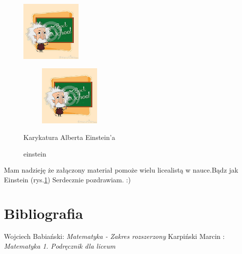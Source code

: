 \documentclass[12pt,a4paper]{article}
\begin{document}
\begin{figure}
\includegraphics[width=3cm, angle=25]{einstein}
\end{figure}

\begin{figure}
\centering
\includegraphics[width=5cm,height=3cm]{einstein}
\caption{einstein}{Karykatura Alberta Einstein'a}
\label{fig:obrazek einstein}
\end{figure}

\center Mam nadzieję że załączony materiał pomoże wielu licealistą w nauce.Bądz jak Einstein (rys.\ref{fig:obrazek einstein})
\center Serdecznie pozdrawiam. :)




\section{Bibliografia}

\begin{thebibliography}{9}
Wojciech Babiański: \emph{Matematyka - Zakres rozszerzony}
Karpiński Marcin : \emph{Matematyka 1. Podręcznik dla liceum}

\end{thebibliography}
\end{document}
